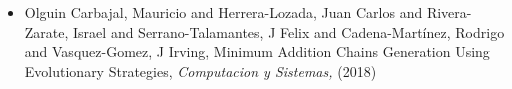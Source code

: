 \begin{itemize} 
\item Olguin Carbajal, Mauricio and Herrera-Lozada, Juan Carlos and Rivera-Zarate, Israel and Serrano-Talamantes, J Felix and Cadena-Martínez, Rodrigo and Vasquez-Gomez, J Irving, Minimum Addition Chains Generation Using Evolutionary Strategies,\textit{ Computacion y Sistemas,} (2018) 
\end{itemize} 
